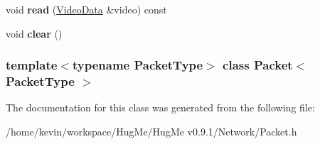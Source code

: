 \begin{DoxyCompactItemize}
\item 
\hypertarget{classPacket_ab6d8226bd69d08362da8402646c14045}{
void {\bfseries read} (\hyperlink{structVideoData}{VideoData} \&video) const }
\label{classPacket_ab6d8226bd69d08362da8402646c14045}

\item 
\hypertarget{classPacket_aeaa7b195cad3722b9f4e39093e8193e5}{
void {\bfseries clear} ()}
\label{classPacket_aeaa7b195cad3722b9f4e39093e8193e5}

\end{DoxyCompactItemize}
\subsubsection*{template$<$typename PacketType$>$ class Packet$<$ PacketType $>$}



The documentation for this class was generated from the following file:\begin{DoxyCompactItemize}
\item 
/home/kevin/workspace/HugMe/HugMe v0.9.1/Network/Packet.h\end{DoxyCompactItemize}
